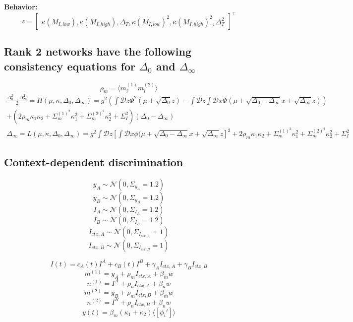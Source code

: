 \documentclass[11pt]{article}
\begin{document}
\textbf{Behavior:} \\
\[z = \begin{bmatrix} \kappa(M_{I,low}), \kappa(M_{I,high}), \Delta_T, \kappa(M_{I,low})^2, \kappa(M_{I,high})^2, \Delta_T^2 \end{bmatrix}^\top \]


\subsection{Rank 2 networks have the following consistency equations for $\Delta_0$ and $\Delta_\infty$}
\[\rho_m = \langle m_i^{(1)} m_i^{(2)} \rangle \]
\begin{equation}
\begin{split}
\frac{\Delta_0^2-\Delta_\infty^2}{2} = H(\mu, \kappa, \Delta_0, \Delta_\infty) = g^2 \left( \int \mathcal{D}z \Phi^2(\mu + \sqrt{\Delta_0}z) - \int \mathcal{D}z \int \mathcal{D}x \Phi(\mu + \sqrt{\Delta_0 - \Delta_\infty}x + \sqrt{\Delta_\infty}z)  \right) \\
+ (2 \rho_m \kappa_1 \kappa_2 + \Sigma_m^{(1)^2} \kappa_1^2 +  \Sigma_m^{(2)^2}  \kappa_2^2 + \Sigma_I^2)(\Delta_0 - \Delta_\infty) \\
\Delta_\infty = L(\mu, \kappa, \Delta_0, \Delta_\infty)  = g^2 \int \mathcal{D}z \left[ \int \mathcal{D}x \phi(\mu + \sqrt{\Delta_0 - \Delta_\infty}x + \sqrt{\Delta_\infty}z \right]^2 + 2 \rho_m \kappa_1 \kappa_2 + \Sigma_m^{(1)^2}  \kappa_1^2 +  \Sigma_m^{(2)^2}  \kappa_2^2 + \Sigma_I^2
\end{split} 
\end{equation}

\subsection{Context-dependent discrimination}
\[y_A \sim \mathcal{N}(0, \Sigma_{y_A}=1.2) \]
\[y_B \sim \mathcal{N}(0, \Sigma_{y_B}=1.2) \]
\[I_{A} \sim \mathcal{N}(0, \Sigma_{I_A}=1.2) \]
\[I_{B} \sim \mathcal{N}(0, \Sigma_{I_B}=1.2) \]
\[I_{ctx,A} \sim \mathcal{N}(0, \Sigma_{I_{ctx,A}}=1) \]
\[I_{ctx,B} \sim \mathcal{N}(0, \Sigma_{I_{ctx,B}}=1) \]

\[I(t) = c_A(t)I^A + c_B(t)I^B + \gamma_A I_{ctx,A} + \gamma_B I_{ctx,B}  \]
\[m^{(1)} = y_A + \rho_m I_{ctx,A} + \beta_m w \]
\[n^{(1)} = I^A + \rho_n I_{ctx,A} + \beta_n w \]
\[m^{(2)} = y_B + \rho_m I_{ctx,B} + \beta_m w \]
\[n^{(2)} = I^B + \rho_n I_{ctx,B} + \beta_n w \]
\[y(t) = \beta_m (\kappa_1 + \kappa_2) \langle \left[\phi_i' \right] \rangle \]
\end{document}
